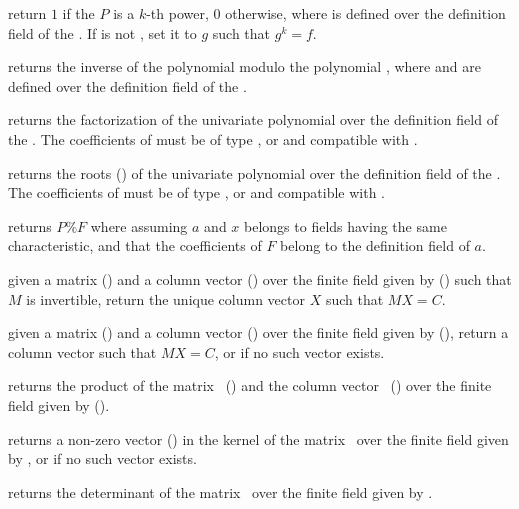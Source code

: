 return $1$ if the  $P$ is a $k$-th power, $0$ otherwise,
where  is defined over the definition field of the  .
If  is not , set it to $g$ such that $g^k = f$.

 returns the inverse
of the polynomial  modulo the polynomial , where  and
 are defined over the definition field of the  .

 returns the factorization of the univariate
polynomial  over the definition field of the  . The
coefficients of  must be of type ,  or 
and compatible with .

 returns the roots ()
of the univariate polynomial  over the definition field of the
 . The coefficients of  must be of type ,
 or  and compatible with .

 returns $P\%F$
where  assuming $a$ and $x$ belongs to fields having the same
characteristic, and that the coefficients of $F$ belong to the definition
field of $a$.


 given a matrix 
() and a column vector  () over the finite
field given by  () such that $M$ is invertible,
return the unique column vector $X$ such that $MX=C$.

 given a matrix
 () and a column vector  () over the
finite field given by  (), return a column vector
 such that $MX=C$, or  if no such vector exists.

 returns the product of
the matrix~ () and the column vector~
() over the finite field given by  ().

 returns a non-zero vector
() in the kernel of the matrix~ over the finite field
given by , or  if no such vector exists.

 returns the determinant of the
matrix~ over the finite field given by .

